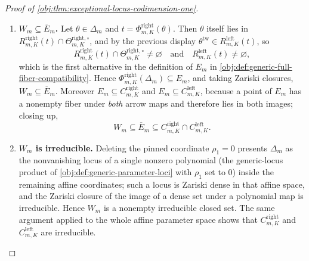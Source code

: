 \begin{proof}[Proof of \cref{obj:thm:exceptional-locus-codimension-one}]
\begin{enumerate}
\item \textbf{\(W_m\subseteq\overline E_m\).}  Let \(\theta\in\Delta_m\) and \(t=\Phi^{\mathrm{right}}_{m,K}(\theta)\).  Then \(\theta\) itself lies in \(R^{\mathrm{right}}_{m,K}(t)\cap\Theta^{\mathrm{right},\circ}_{m,K}\), and by the previous display \(\theta^{\mathrm{tw}}\in R^{\mathrm{left}}_{m,K}(t)\), so
\[
R^{\mathrm{right}}_{m,K}(t)\cap\Theta^{\mathrm{right},\circ}_{m,K}\ne\varnothing
\quad\text{and}\quad
R^{\mathrm{left}}_{m,K}(t)\ne\varnothing,
\]
which is the first alternative in the definition of \(E_m\) in \cref{obj:def:generic-full-fiber-compatibility}.  Hence \(\Phi^{\mathrm{right}}_{m,K}(\Delta_m)\subseteq E_m\), and taking Zariski closures, \(W_m\subseteq\overline E_m\).  Moreover \(E_m\subseteq C^{\mathrm{right}}_{m,K}\) and \(E_m\subseteq C^{\mathrm{left}}_{m,K}\), because a point of \(E_m\) has a nonempty fiber under \emph{both} arrow maps and therefore lies in both images; closing up,
\[
W_m\subseteq\overline E_m\subseteq C^{\mathrm{right}}_{m,K}\cap C^{\mathrm{left}}_{m,K}.
\]

\item \textbf{\(W_m\) is irreducible.}  Deleting the pinned coordinate \(\rho_1=0\) presents \(\Delta_m\) as the nonvanishing locus of a single nonzero polynomial (the generic-locus product of \cref{obj:def:generic-parameter-loci} with \(\rho_1\) set to \(0\)) inside the remaining affine coordinates; such a locus is Zariski dense in that affine space, and the Zariski closure of the image of a dense set under a polynomial map is irreducible.  Hence \(W_m\) is a nonempty irreducible closed set.  The same argument applied to the whole affine parameter space shows that \(C^{\mathrm{right}}_{m,K}\) and \(C^{\mathrm{left}}_{m,K}\) are irreducible.


\end{enumerate}
\end{proof}
